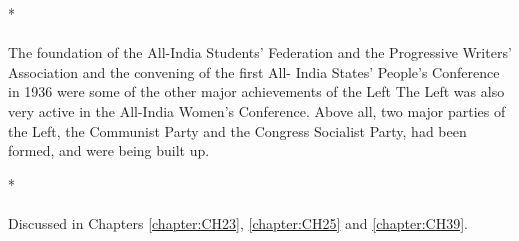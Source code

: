 \begin{multicols}{2}
\begin{center}*\end{center}

\paragraph*{}
The foundation of the All-India Students' Federation and the Progressive Writers' Association and the convening of the first All- India States' People's Conference in 1936 were some of the other major achievements of the Left The Left was also very active in the All-India Women's Conference. Above all, two major parties of the Left, the Communist Party and the Congress Socialist Party, had been formed, and were being built up.

\begin{center}*\end{center}

\paragraph*{}
Discussed in Chapters \ref{chapter:CH23}, \ref{chapter:CH25} and \ref{chapter:CH39}.\end{multicols}